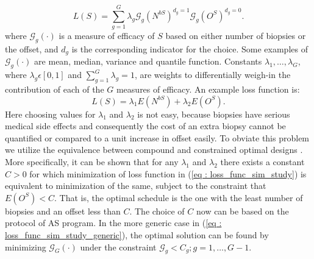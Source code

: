 \begin{equation}
\label{eq : loss_func_sim_study_generic}
L(S) = \sum_{g=1}^G \lambda_g \mathcal{G}_g(N^{bS})^{d_g=1}\mathcal{G}_g(O^S)^{d_g=0}.
\end{equation}
where $\mathcal{G}_g(\cdot)$ is a measure of efficacy of $S$ based on either number of biopsies or the offset, and $d_g$ is the corresponding indicator for the choice. Some examples of $\mathcal{G}_g(\cdot)$ are mean, median, variance and quantile function. Constants $\lambda_1, \ldots, \lambda_G$, where $\lambda_g \epsilon [0,1]$ and $\sum_{g=1}^G \lambda_g = 1$, are weights to differentially weigh-in the contribution of each of the $G$ measures of efficacy. An example loss function is:
\begin{equation}
\label{eq : loss_func_sim_study}
L(S) = \lambda_1 E(N^{bS}) + \lambda_2 E(O^S). 
\end{equation}
Here choosing values for $\lambda_1$ and $\lambda_2$ is not easy, because biopsies have serious medical side effects and consequently the cost of an extra biopsy cannot be quantified or compared to a unit increase in offset easily. To obviate this problem we utilize the equivalence between compound and constrained optimal designs \citep{cook1994equivalence}. More specifically, it can be shown that for any $\lambda_1$ and $\lambda_2$ there exists a constant $C>0$ for which minimization of loss function in (\ref{eq : loss_func_sim_study}) is equivalent to minimization of the same, subject to the constraint that $E(O^S) < C$. That is, the optimal schedule is the one with the least number of biopsies and an offset less than $C$. The choice of $C$ now can be based on the protocol of AS program. In the more generic case in (\ref{eq : loss_func_sim_study_generic}), the optimal solution can be found by minimizing $\mathcal{G}_G(\cdot)$ under the constraint $\mathcal{G}_g < C_g; g=1, \ldots, G-1$.